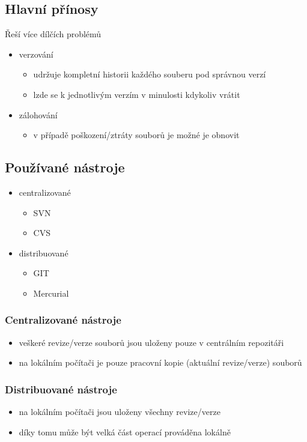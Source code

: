 \documentclass{szzclass}
\begin{document}
\subsection{Hlavní přínosy}
Řeší více dílčích problémů
\begin{itemize}
    \item verzování
    \begin{itemize}
        \item udržuje kompletní historii každého souberu pod správnou verzí
        \item lzde se k jednotlivým verzím v minulosti kdykoliv vrátit
    \end{itemize}
    \item zálohování
    \begin{itemize}
        \item v případě poškození/ztráty souborů je možné je obnovit
    \end{itemize}
\end{itemize}
\subsection{Používané nástroje}
\begin{itemize}
    \item centralizované
    \begin{itemize}
        \item SVN
        \item CVS
    \end{itemize}
    \item distribuované
    \begin{itemize}
        \item GIT
        \item Mercurial
    \end{itemize}
\end{itemize}
\subsubsection{Centralizované nástroje}
\begin{itemize}
    \item veškeré revize/verze souborů jsou uloženy pouze v centrálním repozitáři
    \item na lokálním počítači je pouze pracovní kopie (aktuální revize/verze) souborů
\end{itemize}
\subsubsection{Distribuované nástroje}
\begin{itemize}
    \item na lokálním počítači jsou uloženy všechny revize/verze
    \item díky tomu může být velká část operací prováděna lokálně
\end{itemize}
\end{document}
